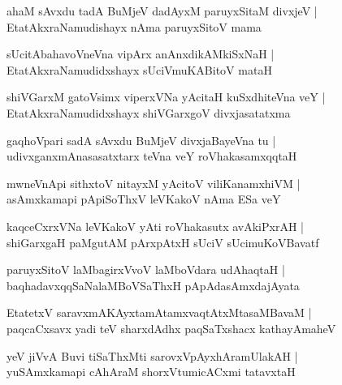 \begin{shloka}
ahaM sAvxdu tadA BuMjeV dadAyxM paruyxSitaM divxjeV |\\
EtatAkxraNamudishayx nAma paruyxSitoV mama
\end{shloka}

\begin{shloka}
sUcitAbahavoVneVna vipArx anAnxdikAMkiSxNaH |\\
EtatAkxraNamudidxshayx sUciVmuKABitoV mataH
\end{shloka}

\begin{shloka}
shiVGarxM gatoVsimx viperxVNa yAcitaH kuSxdhiteVna veY |\\
EtatAkxraNamudidxshayx shiVGarxgoV divxjasatatxma
\end{shloka}

\begin{shloka}
gaqhoVpari sadA sAvxdu BuMjeV divxjaBayeVna tu |\\
udivxganxmAnasasatxtarx teVna veY roVhakasamxqqtaH
\end{shloka}

\begin{shloka}
mwneVnApi sithxtoV nitayxM yAcitoV viliKanamxhiVM |\\
asAmxkamapi pApiSoThxV leVKakoV nAma ESa veY
\end{shloka}

\begin{shloka}
kaqceCxrxVNa leVKakoV yAti roVhakasutx avAkiPxrAH |\\
shiGarxgaH paMgutAM pArxpAtxH sUciV sUcimuKoVBavatf 
\end{shloka}

\begin{shloka}
paruyxSitoV laMbagirxVvoV laMboVdara udAhaqtaH |\\
baqhadavxqqSaNalaMBoVSaThxH pApAdasAmxdajAyata
\end{shloka}

\begin{shloka}
EtatetxV saravxmAKAyxtamAtamxvaqtAtxMtasaMBavaM |\\
paqcaCxsavx yadi teV sharxdAdhx paqSaTxshacx kathayAmaheV 
\end{shloka}

\begin{shloka}
yeV jiVvA Buvi tiSaThxMti sarovxVpAyxhAramUlakAH |\\
yuSAmxkamapi cAhAraM shorxVtumicACxmi tatavxtaH
\end{shloka}

